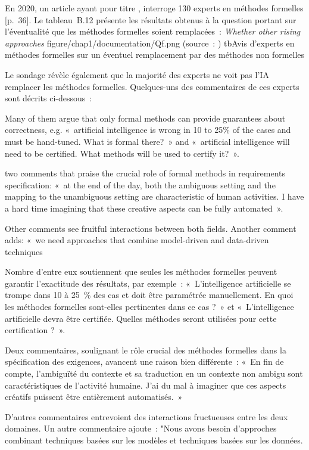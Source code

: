 {En 2020, un article ayant pour titre , interroge 130 experts en méthodes formelles [p.~36]. Le tableau~B.12 présente les résultats obtenus à la question portant sur l'éventualité que les méthodes formelles soient remplacées~:
\taben
{\textit{Whether other rising approaches}}
{figure/chap1/documentation/Qf.png}
{(source~: \cite{ter_formal_2020})}
{}{}{tb}{Avis d'experts en méthodes formelles sur un éventuel remplacement par des méthodes non formelles}

Le sondage révèle également que la majorité des experts ne voit pas l'IA remplacer les méthodes formelles. Quelques-uns des commentaires de ces experts sont décrits ci-dessous~:
\quoteenfrlist
{
\item [][---] Many of them argue that only formal methods can provide guarantees about correctness, e.g. «~artificial intelligence is wrong in 10 to 25\% of the cases and must be hand-tuned. What is formal there?~» and «~artificial intelligence will need to be certified. What methods will be used to certify it?~». 
\item [][---] \elide two comments that praise the crucial role of formal methods in requirements specification: «~at the end of the day, both the ambiguous setting and the mapping to the unambiguous setting are characteristic of human activities. I have a hard time imagining that these creative aspects can be fully automated~». 
\item [][---] Other comments see fruitful interactions between both fields. Another comment adds: «~we need approaches that combine model-driven and data-driven techniques}
{
\item [][---] Nombre d'entre eux soutiennent que seules les méthodes formelles peuvent garantir l'exactitude des résultats, par exemple~: «~L'intelligence artificielle se trompe dans 10 à 25~\% des cas et doit être paramétrée manuellement. En quoi les méthodes formelles sont-elles pertinentes dans ce cas ?~» et «~L'intelligence artificielle devra être certifiée. Quelles méthodes seront utilisées pour cette certification ?~». 
\item [][---] \elide
Deux commentaires, soulignant le rôle crucial des méthodes formelles dans la spécification des exigences, avancent une raison bien différente~: «~En fin de compte, l’ambiguïté du contexte et sa traduction en un contexte non ambigu sont caractéristiques de l’activité humaine. J’ai du mal à imaginer que ces aspects créatifs puissent être entièrement automatisés.~» 
\item [][---] D’autres commentaires entrevoient des interactions fructueuses entre les deux domaines. \elide Un autre commentaire ajoute~: "Nous avons besoin d’approches combinant techniques basées sur les modèles et techniques basées sur les données.}
{\cite{ter_formal_2020}}
\vspace{-1\baselineskip}
}{}

